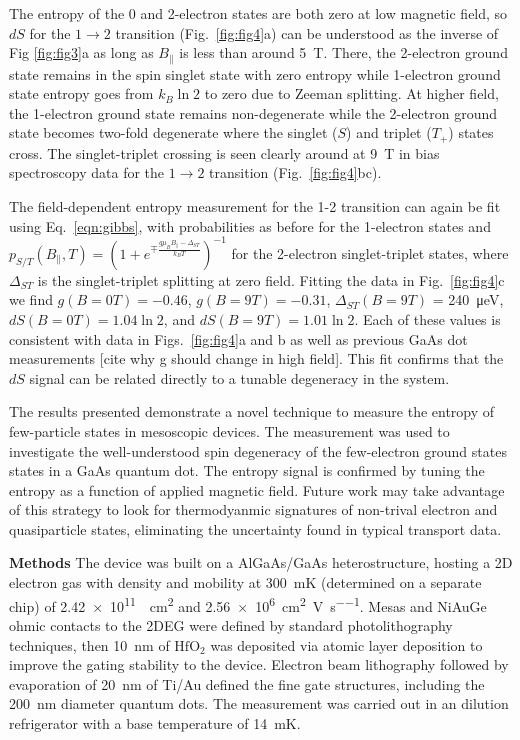 \documentclass[twocolumn,showpacs,preprintnumbers,amsmath,amssymb,pra,aps,superscriptaddress]{revtex4-1}
\begin{document}
The entropy of the 0 and 2-electron states are both zero at low magnetic field, so $dS$ for the $1\rightarrow 2$ transition (Fig.~\ref{fig:fig4}a) can be understood as the inverse of Fig \ref{fig:fig3}a as long as $B_\parallel$ is less than around \SI{5}{\tesla}.  There, the 2-electron ground state remains in the spin singlet state with zero entropy while 1-electron ground state entropy goes from $k_B\ln{2}$ to zero due to Zeeman splitting. At higher field, the 1-electron ground state remains non-degenerate while the 2-electron ground state becomes two-fold degenerate where the singlet ($S$) and triplet ($T_+$) states cross. The singlet-triplet crossing is seen clearly around at \SI{9}{\tesla} in bias spectroscopy data for the $1\rightarrow 2$ transition (Fig.~\ref{fig:fig4}bc). 

The field-dependent entropy measurement for the 1-2 transition can again be fit using Eq.~\ref{eqn:gibbs}, with probabilities as before for the 1-electron states and $p_{S/T}(B_\parallel, T) = (1+ e^{\mp \frac{g\mu_B B_\parallel - \Delta_{ST}}{k_B T}})^{-1}$ for the 2-electron singlet-triplet states, where $\Delta_{ST}$ is the singlet-triplet splitting at zero field. Fitting the data in Fig.~\ref{fig:fig4}c we find $g(B{=}0T)=-0.46$, $g(B{=}9T)=-0.31$, $\Delta_{ST}(B{=}9T)$ = \SI{240}{\micro\electronvolt}, $dS(B{=}0T) = 1.04\ln{2}$, and $dS(B{=}9T) = 1.01\ln{2}$. Each of these values is consistent with data in Figs.~\ref{fig:fig4}a and b as well as previous GaAs dot measurements [cite why g should change in high field]. This fit confirms that the $dS$ signal can be related directly to a tunable degeneracy in the system.

The results presented demonstrate a novel technique to measure the entropy of few-particle states in mesoscopic devices. The measurement was used to investigate the well-understood spin degeneracy of the few-electron ground states states in a GaAs quantum dot. The entropy signal is confirmed by tuning the entropy as a function of applied magnetic field. Future work may take advantage of this strategy to look for thermodyanmic signatures of non-trival electron and quasiparticle states, eliminating the uncertainty found in typical transport data.

\noindent \textbf{Methods} The device was built on a AlGaAs/GaAs heterostructure, hosting a 2D electron gas with density and mobility at \SI{300}{\milli\kelvin} (determined on a separate chip) of \SI{2.42e11}{\per\square\centi\metre} and \SI[per-mode=symbol]{2.56e6}{\square\centi\metre\per\volt\per\second}.   Mesas and NiAuGe ohmic contacts to the 2DEG were defined by standard photolithography techniques, then \SI{10}{\nano\metre} of $\mathrm{HfO_2}$ was deposited via atomic layer deposition to improve the gating stability to the device. Electron beam lithography followed by evaporation of \SI{20}{\nano\metre} of Ti/Au defined the fine gate structures, including the \SI{200}{\nano\metre} diameter quantum dots. The measurement was carried out in an dilution refrigerator with a base temperature of \SI{14}{\milli\kelvin}.
\end{document}
